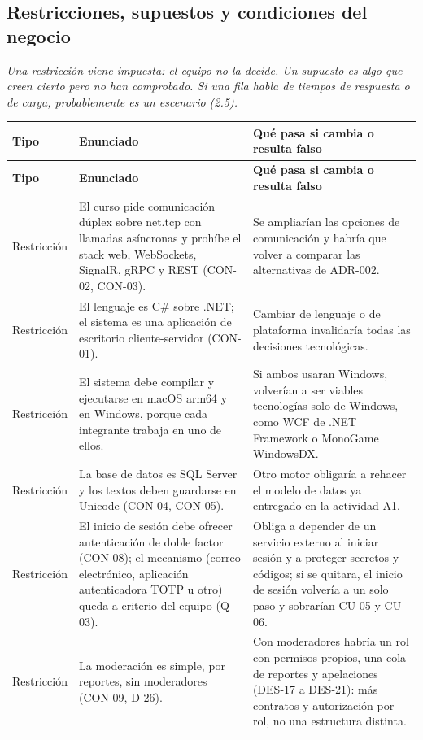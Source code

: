 \documentclass[11pt,letterpaper]{article}
\newcommand{\hint}[1]{{\itshape\color{black!70}#1}\par} %
\newcommand{\hd}[1]{\textbf{\small #1}}
\newcommand{\headrow}{\rowcolor{SADHead}}
\begin{document}
\subsection{Restricciones, supuestos y condiciones del negocio}
\hint{Una restricción viene impuesta: el equipo no la decide. Un supuesto es algo que creen cierto pero no han comprobado. Si una fila habla de tiempos de respuesta o de carga, probablemente es un escenario (2.5).}
\begin{xltabular}{\linewidth}{|p{3.6cm}|Y|Y|}\hline
  \headrow\hd{Tipo} & \hd{Enunciado} & \hd{Qué pasa si cambia o resulta falso}\\\hline
  \endfirsthead
  \headrow\hd{Tipo} & \hd{Enunciado} & \hd{Qué pasa si cambia o resulta falso}\\\hline
  \endhead
  \small Restricción & El curso pide comunicación dúplex sobre net.tcp con llamadas asíncronas y prohíbe el stack web, WebSockets, SignalR, gRPC y REST (CON-02, CON-03). & Se ampliarían las opciones de comunicación y habría que volver a comparar las alternativas de ADR-002.\\\hline
  \small Restricción & El lenguaje es C\# sobre .NET; el sistema es una aplicación de escritorio cliente-servidor (CON-01). & Cambiar de lenguaje o de plataforma invalidaría todas las decisiones tecnológicas.\\\hline
  \small Restricción & El sistema debe compilar y ejecutarse en macOS arm64 y en Windows, porque cada integrante trabaja en uno de ellos. & Si ambos usaran Windows, volverían a ser viables tecnologías solo de Windows, como WCF de .NET Framework o MonoGame WindowsDX.\\\hline
  \small Restricción & La base de datos es SQL Server y los textos deben guardarse en Unicode (CON-04, CON-05). & Otro motor obligaría a rehacer el modelo de datos ya entregado en la actividad A1.\\\hline
  \small Restricción & El inicio de sesión debe ofrecer autenticación de doble factor (CON-08); el mecanismo (correo electrónico, aplicación autenticadora TOTP u otro) queda a criterio del equipo (Q-03). & Obliga a depender de un servicio externo al iniciar sesión y a proteger secretos y códigos; si se quitara, el inicio de sesión volvería a un solo paso y sobrarían CU-05 y CU-06.\\\hline
  \small Restricción & La moderación es simple, por reportes, sin moderadores (CON-09, D-26). & Con moderadores habría un rol con permisos propios, una cola de reportes y apelaciones (DES-17 a DES-21): más contratos y autorización por rol, no una estructura distinta.\\\hline

\end{xltabular}
\end{document}
